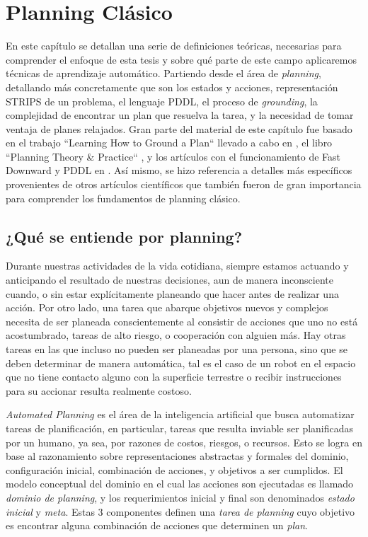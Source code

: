 \chapter{Planning Clásico}
\label{ch:lit_planning}

En este capítulo se detallan una serie de definiciones teóricas, necesarias
para comprender el enfoque de esta tesis y sobre qué parte de este campo
aplicaremos técnicas de aprendizaje automático. Partiendo desde el área de
\emph{planning}, detallando más concretamente que son los estados y acciones,
representación STRIPS de un problema, el lenguaje PDDL, el proceso de
\emph{grounding}, la complejidad de encontrar un plan que resuelva la tarea, y
la necesidad de tomar ventaja de planes relajados. Gran parte del material de
este capítulo fue basado en el trabajo ``Learning How to Ground a Plan`` llevado
a cabo en \citep{Gnad_Torralba_Dominguez_Areces_Bustos_2019}, el libro
``Planning Theory \& Practice`` \citep{Nau-Ghallab-Malik-Traverso-2004}, y los
artículos con el funcionamiento de Fast Downward y PDDL en \citep{Helmert-2011,
McDermott1998}. Así mismo, se hizo referencia a detalles más específicos
provenientes de otros artículos científicos que también fueron de gran
importancia para comprender los fundamentos de planning clásico.

\section{¿Qué se entiende por planning?}

Durante nuestras actividades de la vida cotidiana, siempre estamos actuando y
anticipando el resultado de nuestras decisiones, aun de manera inconsciente cuando, o sin estar explícitamente planeando que hacer antes de realizar una
acción. Por otro lado, una tarea que abarque objetivos nuevos y complejos necesita de ser planeada conscientemente al consistir de acciones que uno no está acostumbrado, tareas de alto riesgo, o cooperación con alguien más. Hay otras tareas en las que incluso no pueden ser planeadas por una persona, sino que se deben determinar de manera automática, tal es el caso de un robot en el espacio que no tiene contacto alguno con la superficie terrestre o recibir instrucciones para su accionar resulta realmente costoso.

\emph{Automated Planning} es el área de la inteligencia artificial que busca automatizar tareas de planificación, en particular, tareas que resulta inviable ser planificadas por un humano, ya sea, por razones de costos, riesgos, o recursos. Esto se logra en base al razonamiento sobre representaciones
abstractas y formales del dominio, configuración inicial, combinación de
acciones, y objetivos a ser cumplidos. El modelo conceptual del dominio en el
cual las acciones son ejecutadas es llamado \emph{dominio de planning}, y los
requerimientos inicial y final son denominados \emph{estado inicial} y
\emph{meta}. Estas 3 componentes definen una \emph{tarea de planning} cuyo
objetivo es encontrar alguna combinación de acciones que determinen un
\emph{plan}.

